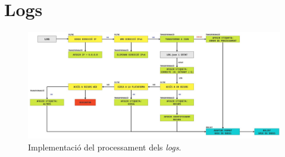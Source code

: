 \section{Logs}\label{sec:logs}

\begin{figure}[htbp]
    \centerline{\includegraphics[width=1.3\textwidth]{figures/log-processing-workflow}}
    \captionsetup{justification=centering}
    \caption{Implementació del processament dels \textit{logs}.}\label{fig:log-processing}
\end{figure}
